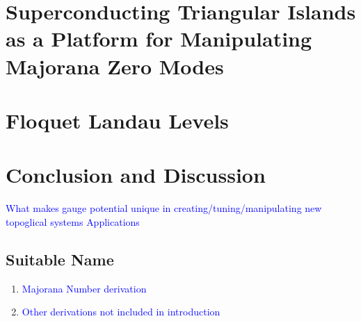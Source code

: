 \documentclass[12pt,doctor]{thesis}
\newcommand{\Blue}[1]{\textcolor{blue}{#1}}
\begin{document}
\chapter{Superconducting Triangular Islands as a Platform for Manipulating Majorana Zero Modes}







\chapter{Floquet Landau Levels}






\chapter{Conclusion and Discussion}

\Blue{What makes gauge potential unique in creating/tuning/manipulating new topoglical systems}
\Blue{Applications}

\begin{appendices}
\chapter{Suitable Name}
\begin{enumerate}
  \item \Blue{Majorana Number derivation}
  \item \Blue{Other derivations not included in introduction}
\end{enumerate}




\end{appendices}




\end{document}
